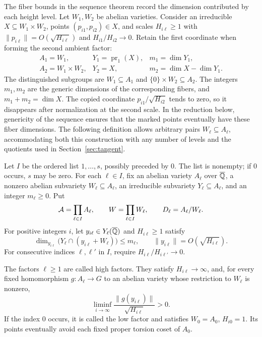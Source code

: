 The fiber bounds in the sequence theorem record the dimension
contributed by each height level. Let $W_1,W_2$ be abelian varieties.
Consider an irreducible $X\subseteq W_1\times W_2$, points
$(p_{i1},p_{i2})\in X$, and scales $H_{i\ell}\ge1$ with
$\|p_{i\ell}\|=O(\sqrt{H_{i\ell}})$ and
$H_{i1}/H_{i2}\to0$. Retain the first coordinate when forming the
second ambient factor:
\[
 \begin{array}{lll}
 A_1=W_1,&Y_1=\operatorname{pr}_1(X),&m_1=\dim Y_1,\\
 A_2=W_1\times W_2,&Y_2=X,&m_2=\dim X-\dim Y_1.
 \end{array}
\]
The distinguished subgroups are $W_1\subseteq A_1$ and
$\{0\}\times W_2\subseteq A_2$. The integers $m_1,m_2$ are the
generic dimensions of the corresponding fibers, and
$m_1+m_2=\dim X$. The copied coordinate
$p_{i1}/\sqrt{H_{i2}}$ tends to zero, so it disappears after
normalization at the second scale. In the reduction below, genericity
of the sequence ensures that the marked points eventually have these
fiber dimensions. The following definition allows arbitrary pairs
$W_\ell\subseteq A_\ell$, accommodating both this construction with
any number of levels and the quotients used in Section~\ref{sec:tangent}.

\begin{definition}
\label{def:sequence-data}
Let $I$ be the ordered list $1,\ldots,s$, possibly preceded by $0$.
The list is nonempty; if $0$ occurs, $s$ may be zero. For each
$\ell\in I$, fix an abelian variety $A_\ell$ over $\overline{\mathbb Q}$, a nonzero
abelian subvariety $W_\ell\subseteq A_\ell$, an irreducible subvariety
$Y_\ell\subseteq A_\ell$, and an integer $m_\ell\ge0$. Put
\[
 \mathcal A=\prod_{\ell\in I}A_\ell,
 \qquad W=\prod_{\ell\in I}W_\ell,
 \qquad D_\ell=A_\ell/W_\ell.
\]
For positive integers $i$, let $y_{i\ell}\in Y_\ell(\overline{\mathbb Q})$ and
$H_{i\ell}\ge1$ satisfy
\begin{equation}
 \label{eq:sequence-fibers}
 \dim_{y_{i\ell}}\bigl(Y_\ell\cap(y_{i\ell}+W_\ell)\bigr)
 \le m_\ell,
 \qquad \|y_{i\ell}\|=O(\sqrt{H_{i\ell}}).
\end{equation}
For consecutive indices $\ell,\ell'$ in $I$, require
$H_{i\ell}/H_{i\ell'}\to0$.

The factors $\ell\ge1$ are called high factors. They satisfy
$H_{i\ell}\to\infty$, and, for every fixed homomorphism
$g:A_\ell\to G$ to an abelian variety whose restriction to $W_\ell$
is nonzero,
\begin{equation}
 \label{eq:sequence-nondegenerate}
 \liminf_{i\to\infty}
 \frac{\|g(y_{i\ell})\|}{\sqrt{H_{i\ell}}}>0.
\end{equation}
If the index $0$ occurs, it is called the low factor and satisfies
$W_0=A_0$, $H_{i0}=1$. Its points eventually avoid each fixed proper
torsion coset of $A_0$.
\end{definition}

